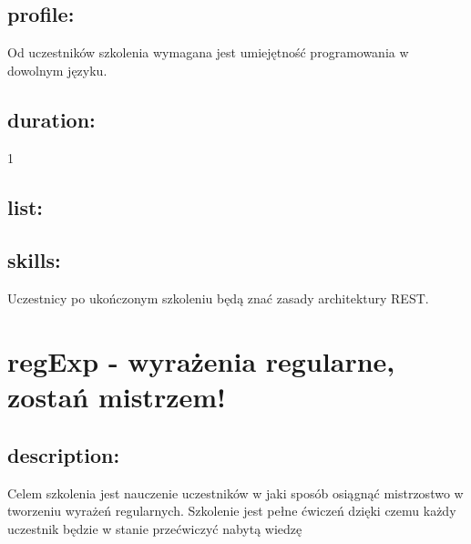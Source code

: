 \documentclass{article}[10pt]
\begin{document}
	\subsection*{profile:}
\begin{adjustwidth}{2cm}{}
	
Od uczestników szkolenia wymagana jest umiejętność programowania w dowolnym języku.

\end{adjustwidth}
	\subsection*{duration:}
\begin{adjustwidth}{2cm}{}
	1
\end{adjustwidth}

	\subsection*{list:}
\begin{adjustwidth}{1.5cm}{}
	\begin{itemize}






	\end{itemize}
\end{adjustwidth}

	\subsection*{skills:}
\begin{adjustwidth}{2cm}{}
	
Uczestnicy po ukończonym szkoleniu będą znać zasady architektury REST.
\end{adjustwidth}

\newpage


    
	\section{regExp - wyrażenia regularne, zostań mistrzem!}

	\subsection*{description:}
	\begin{adjustwidth}{2cm}{}
		
Celem szkolenia jest nauczenie uczestników w jaki sposób osiągnąć mistrzostwo w tworzeniu wyrażeń regularnych. Szkolenie jest pełne ćwiczeń dzięki czemu każdy uczestnik będzie w stanie przećwiczyć nabytą wiedzę
	\end{adjustwidth}
\end{document}
